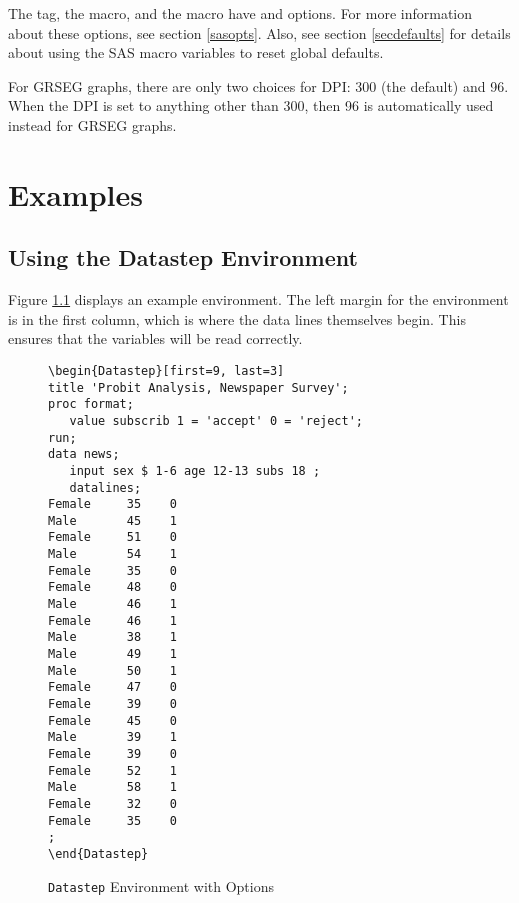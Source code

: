 \documentclass[article,oneside]{memoir}
\begin{document}
  The  tag, the  macro, and the
   macro have  and  options. For more information
  about these options, see section \ref{sasopts}.
  Also, see section \ref{secdefaults} for details about
  using the SAS macro variables to reset global defaults. 
  
  For GRSEG graphs, there are only two choices for DPI: 300 (the default) and 96. 
  When the DPI is set to anything other than 300, 
  then 96 is automatically used instead for GRSEG graphs.
       
\chapter{Examples}

\section{Using the Datastep Environment}\label{dsex}

  Figure \ref{fig:sd2} displays an example  environment. The left margin for 
  the environment is in the first column, which is where the data lines themselves begin.
  This ensures that the variables will be read correctly.

\begin{figure}[H]
\begin{snugshade}
\begin{verbatim}
\begin{Datastep}[first=9, last=3]
title 'Probit Analysis, Newspaper Survey';
proc format;
   value subscrib 1 = 'accept' 0 = 'reject';
run;
data news;
   input sex $ 1-6 age 12-13 subs 18 ;
   datalines;
Female     35    0 
Male       45    1 
Female     51    0 
Male       54    1 
Female     35    0 
Female     48    0 
Male       46    1 
Female     46    1 
Male       38    1 
Male       49    1 
Male       50    1 
Female     47    0 
Female     39    0 
Female     45    0 
Male       39    1 
Female     39    0 
Female     52    1 
Male       58    1 
Female     32    0 
Female     35    0 
;
\end{Datastep}
\end{verbatim}
\end{snugshade}
\caption{\texttt{Datastep} Environment with Options}\label{fig:sd2}
\end{figure}
  
\end{document}
